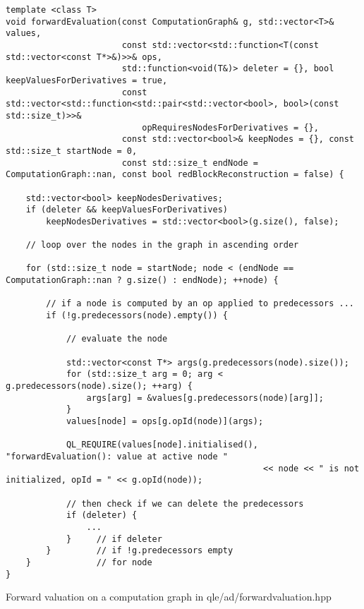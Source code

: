 \begin{listing}[hbt]
\begin{verbatim}
template <class T>
void forwardEvaluation(const ComputationGraph& g, std::vector<T>& values,
                       const std::vector<std::function<T(const std::vector<const T*>&)>>& ops,
                       std::function<void(T&)> deleter = {}, bool keepValuesForDerivatives = true,
                       const std::vector<std::function<std::pair<std::vector<bool>, bool>(const std::size_t)>>&
                           opRequiresNodesForDerivatives = {},
                       const std::vector<bool>& keepNodes = {}, const std::size_t startNode = 0,
                       const std::size_t endNode = ComputationGraph::nan, const bool redBlockReconstruction = false) {

    std::vector<bool> keepNodesDerivatives;
    if (deleter && keepValuesForDerivatives)
        keepNodesDerivatives = std::vector<bool>(g.size(), false);

    // loop over the nodes in the graph in ascending order

    for (std::size_t node = startNode; node < (endNode == ComputationGraph::nan ? g.size() : endNode); ++node) {

        // if a node is computed by an op applied to predecessors ...
        if (!g.predecessors(node).empty()) {

            // evaluate the node

            std::vector<const T*> args(g.predecessors(node).size());
            for (std::size_t arg = 0; arg < g.predecessors(node).size(); ++arg) {
                args[arg] = &values[g.predecessors(node)[arg]];
            }
            values[node] = ops[g.opId(node)](args);

            QL_REQUIRE(values[node].initialised(), "forwardEvaluation(): value at active node "
                                                   << node << " is not initialized, opId = " << g.opId(node));

            // then check if we can delete the predecessors
            if (deleter) {
                ...
            }     // if deleter
        }         // if !g.predecessors empty
    }             // for node
}
\end{verbatim}
\caption{Forward valuation on a computation graph in qle/ad/forwardvaluation.hpp}
\label{lst:forwardvaluation}
\end{listing}

